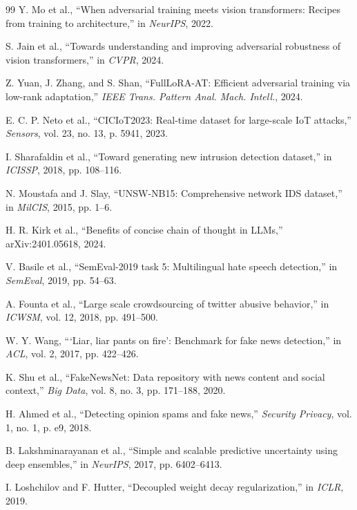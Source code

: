 \documentclass[12pt,a4paper]{article}
\theoremstyle{definition}
\begin{document}
\begin{thebibliography}{99}
Y. Mo et al., ``When adversarial training meets vision transformers: Recipes from training to architecture,'' in \emph{NeurIPS}, 2022.

S. Jain et al., ``Towards understanding and improving adversarial robustness of vision transformers,'' in \emph{CVPR}, 2024.

Z. Yuan, J. Zhang, and S. Shan, ``FullLoRA-AT: Efficient adversarial training via low-rank adaptation,'' \emph{IEEE Trans. Pattern Anal. Mach. Intell.}, 2024.

E. C. P. Neto et al., ``CICIoT2023: Real-time dataset for large-scale IoT attacks,'' \emph{Sensors}, vol. 23, no. 13, p. 5941, 2023.

I. Sharafaldin et al., ``Toward generating new intrusion detection dataset,'' in \emph{ICISSP}, 2018, pp. 108--116.

N. Moustafa and J. Slay, ``UNSW-NB15: Comprehensive network IDS dataset,'' in \emph{MilCIS}, 2015, pp. 1--6.

H. R. Kirk et al., ``Benefits of concise chain of thought in LLMs,'' arXiv:2401.05618, 2024.

V. Basile et al., ``SemEval-2019 task 5: Multilingual hate speech detection,'' in \emph{SemEval}, 2019, pp. 54--63.

A. Founta et al., ``Large scale crowdsourcing of twitter abusive behavior,'' in \emph{ICWSM}, vol. 12, 2018, pp. 491--500.

W. Y. Wang, ```Liar, liar pants on fire': Benchmark for fake news detection,'' in \emph{ACL}, vol. 2, 2017, pp. 422--426.

K. Shu et al., ``FakeNewsNet: Data repository with news content and social context,'' \emph{Big Data}, vol. 8, no. 3, pp. 171--188, 2020.

H. Ahmed et al., ``Detecting opinion spams and fake news,'' \emph{Security Privacy}, vol. 1, no. 1, p. e9, 2018.

B. Lakshminarayanan et al., ``Simple and scalable predictive uncertainty using deep ensembles,'' in \emph{NeurIPS}, 2017, pp. 6402--6413.

I. Loshchilov and F. Hutter, ``Decoupled weight decay regularization,'' in \emph{ICLR}, 2019.


\end{thebibliography}
\end{document}
